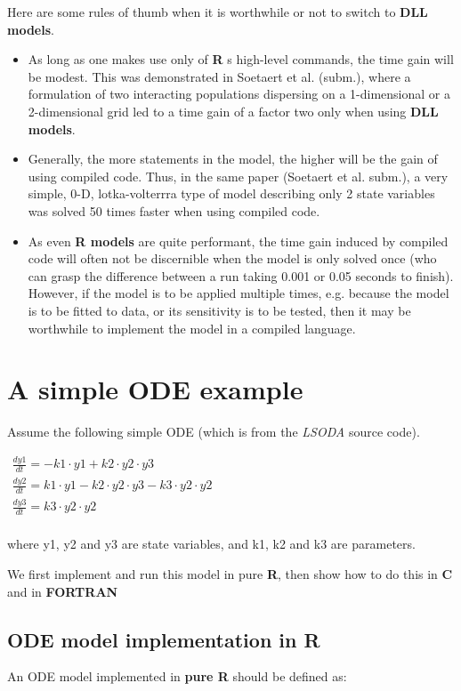 \documentclass[english]{article}
\newcommand{\R}{\textbf{\textsf{R}}\xspace}
\newcommand{\FOR}{\textbf{\textsf{FORTRAN}}\xspace}
\newcommand{\C}{\textbf{\textsf{C}}\xspace}
\newcommand{\Rmodels}{\textbf{\textsf{R models}}\xspace}
\newcommand{\DLLmodels}{\textbf{\textsf{DLL models}}\xspace}
\begin{document}
Here are some rules of thumb when  it is worthwhile or not to switch to \DLLmodels.
\begin{itemize}
\item As long as one makes use only of \R s high-level commands,
the time gain will be modest. This was demonstrated in Soetaert et
al. (subm.), where a formulation of two interacting populations
dispersing on a 1-dimensional or a 2-dimensional grid led to a
time gain of a factor two only when using \DLLmodels. \item
Generally, the more statements in the model, the higher will be
the gain of using compiled code. Thus, in the same paper (Soetaert
et al. subm.), a very simple, 0-D, lotka-volterrra type of model
describing only 2 state variables was solved 50 times faster when
using compiled code. \item As even \Rmodels are quite performant,
the time gain induced by compiled code will often not be
discernible when the model is only solved once (who can grasp the
difference between a run taking 0.001 or 0.05 seconds to finish).
However, if the model is to be applied multiple times, e.g.
because the model is to be fitted to data, or its sensitivity is
to be tested, then it may be worthwhile to implement the model in
a compiled language.
\end{itemize}

\section{A simple ODE example}

Assume the following simple ODE (which is from the \emph{LSODA} source code).

$\begin{array}{l}
 \frac{{dy1}}{{dt}} =  - k1 \cdot y1 + k2 \cdot y2 \cdot y3 \\
 \frac{{dy2}}{{dt}} = k1 \cdot y1 - k2 \cdot y2 \cdot y3 - k3 \cdot y2 \cdot y2 \\
 \frac{{dy3}}{{dt}} = k3 \cdot y2 \cdot y2 \\
 \end{array}$

 where y1, y2 and y3 are state variables, and k1, k2 and k3 are parameters.

We first implement and run this model in pure \R, then show how to do this in \C and in \FOR
\subsection{ODE model implementation in \R}
An ODE model implemented in \textbf{pure \R} should be defined as:
\end{document}
